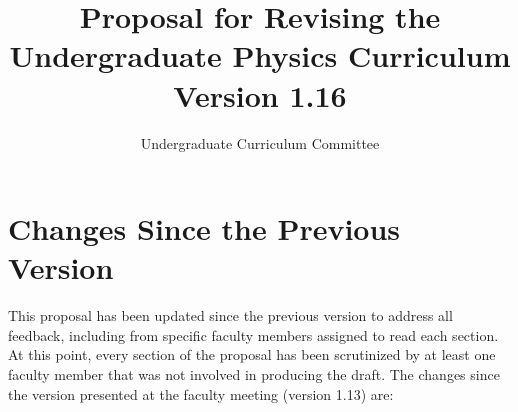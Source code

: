 \documentclass[12pt]{article}
\begin{document}

\title{Proposal for Revising the \\ Undergraduate Physics Curriculum \\ Version 1.16}
\author{Undergraduate Curriculum Committee}

\maketitle

\section{Changes Since the Previous Version}

This proposal has been updated since the previous version to address
all feedback, including from specific faculty members assigned to read
each section.  At this point, every section of the proposal has been
scrutinized by at least one faculty member that was not involved in
producing the draft.  The changes since the version presented at the
faculty meeting (version 1.13) are:
\end{document}
